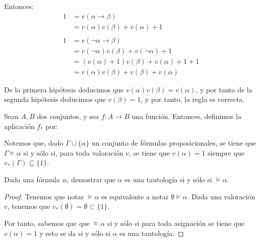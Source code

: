 \begin{ejercicio*}
\begin{enumerate}
        Entonces:
        \begin{align*}
            1 &= v(\alpha\rightarrow\beta)\\
            &= v(\alpha)v(\beta)+v(\alpha)+1\\ \\
            1 &= v(\lnot\alpha\rightarrow\beta)\\
            &= v(\lnot\alpha)v(\beta)+v(\lnot\alpha)+1\\
            &= (v(\alpha)+1)v(\beta)+v(\alpha)+1+1\\
            &= v(\alpha)v(\beta)+v(\beta)+v(\alpha)
        \end{align*}

        De la primera hipótesis deducimos que $v(\alpha)v(\beta)=v(\alpha)$,
        y por tanto de la segunda hipótesis deducimos que $v(\beta)=1$, y por tanto, la regla es correcta.
    \end{enumerate}

\end{ejercicio*}

\begin{observacion}
    Sean $A,B$ dos conjuntos, y sea $f:A\to B$ una función. Entonces, definimos la aplicación $f_\ast$ por:

    Notemos que, dado $\Gamma \cup \{\alpha\}$ un conjunto de fórmulas proposicionales,
    se tiene que $\Gamma \vDash \alpha$ si y sólo si, para toda valoración $v$, se tiene que $v(\alpha)=1$ siempre que $v_\ast(\Gamma)\subseteq \{1\}$.
\end{observacion}

\begin{prop}
    Dada una fórmula $\alpha$, demostrar que
    $\alpha$ es una tautología si y sólo si $\vDash\alpha$.
    \begin{proof}

        Tenemos que notar $\vDash\alpha$ es equivalente a notar $\emptyset\vDash\alpha$.
        Dada una valoración $v$, tenemos que $v_\ast(\emptyset )=\emptyset \subset \{1\}$.
        
        Por tanto, sabemos que que $\vDash\alpha$ si y sólo si
        para toda asignación se tiene que $v(\alpha)=1$ y esto se da si y sólo si $\alpha$ es una tautología.
    \end{proof}
    
\end{prop}

